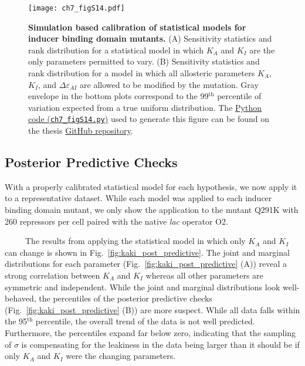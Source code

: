 \documentclass[12pt]{caltech_thesis}
\begin{document}
\hypertarget{fig:ind_sbc}{%
\begin{figure}
\centering
\texttt{[image: ch7\_figS14.pdf]}
\caption[{Simulation based calibration of statistical models for inducer
binding domain mutants.}]{\textbf{Simulation based calibration of
statistical models for inducer binding domain mutants.} (A) Sensitivity
statistics and rank distribution for a statistical model in which
\(K_A\) and \(K_I\) are the only parameters permitted to vary. (B)
Sensitivity statistics and rank distribution for a model in which all
allosteric parameters \(K_A\), \(K_I\), and \(\Delta\varepsilon_{AI}\)
are allowed to be modified by the mutation. Gray envelope in the bottom
plots correspond to the 99\(^\text{th}\) percentile of variation
expected from a true uniform distribution. The
\href{https://github.com/gchure/phd/blob/master/src/chapter_07/code/ch7_figS14.py}{Python
code (\texttt{ch7\_figS14.py})} used to generate this figure can be
found on the thesis \href{https://github.com/gchure/phd}{GitHub
repository}.}
\label{fig:ind_sbc}
\end{figure}
}

\hypertarget{posterior-predictive-checks-1}{%
\subsection{Posterior Predictive
Checks}\label{posterior-predictive-checks-1}}

With a properly calibrated statistical model for each hypothesis, we now
apply it to a representative dataset. While each model was applied to
each inducer binding domain mutant, we only show the application to the
mutant Q291K with 260 repressors per cell paired with the native
\emph{lac} operator O2.

~~~~~The results from applying the statistical model in which only
\(K_A\) and \(K_I\) can change is shown in
Fig.~\ref{fig:kaki_post_predictive}. The joint and marginal
distributions for each parameter (Fig.~\ref{fig:kaki_post_predictive}
(A)) reveal a strong correlation between \(K_A\) and \(K_I\) whereas all
other parameters are symmetric and independent. While the joint and
marginal distributions look well-behaved, the percentiles of the
posterior predictive checks (Fig.~\ref{fig:kaki_post_predictive} (B))
are more suspect. While all data falls within the 95\(^\text{th}\)
percentile, the overall trend of the data is not well predicted.
Furthermore, the percentiles expand far below zero, indicating that the
sampling of \(\sigma\) is compensating for the leakiness in the data
being larger than it should be if only \(K_A\) and \(K_I\) were the
changing parameters.
\end{document}
